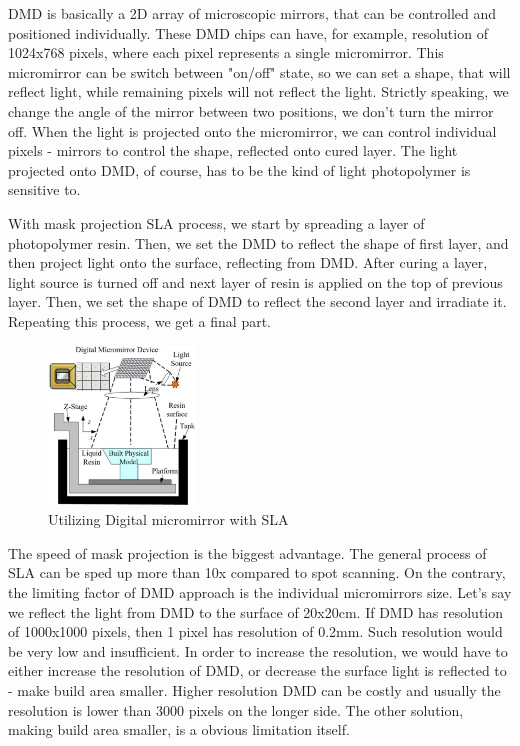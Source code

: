 \documentclass[a4paper, twoside, 11pt]{report}
\begin{document}
	DMD is basically a 2D array of microscopic mirrors, that can be controlled and positioned individually. These DMD chips can have, for example, resolution of 1024x768 pixels, where each pixel represents a single micromirror. This micromirror can be switch between "on/off" state, so we can set a shape, that will reflect light, while remaining pixels will not reflect the light. Strictly speaking, we change the angle of the mirror between two positions, we don't turn the mirror off. When the light is projected onto the micromirror, we can control individual pixels - mirrors to control the shape, reflected onto cured layer. The light projected onto DMD, of course, has to be the kind of light photopolymer is sensitive to.
	
	With mask projection SLA process, we start by spreading a layer of photopolymer resin. Then, we set the DMD to reflect the shape of first layer, and then project light onto the surface, reflecting from DMD. After curing a layer, light source is turned off and next layer of resin is applied on the top of previous layer. Then, we set the shape of DMD to reflect the second layer and irradiate it. Repeating this process, we get a final part.\\
%
\begin{figure}
 	\includegraphics[width=0.35\textwidth, angle=0]{DMD}
	\caption{Utilizing Digital micromirror with SLA}
\end{figure}
%
The speed of mask projection is the biggest advantage. The general process of SLA can be sped up more than 10x compared to spot scanning. On the contrary, the limiting factor of DMD approach is the individual micromirrors size. Let's say we reflect the light from DMD to the surface of 20x20cm. If DMD has resolution of 1000x1000 pixels, then 1 pixel has resolution of 0.2mm. Such resolution would be very low and insufficient. In order to increase the resolution, we would have to either increase the resolution of DMD, or decrease the surface light is reflected to - make build area smaller. Higher resolution DMD can be costly and usually the resolution is lower than 3000 pixels on the longer side. The other solution, making build area smaller, is a obvious limitation itself.
\end{document}
